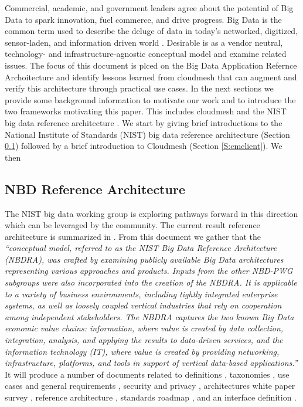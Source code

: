 Commercial, academic, and government leaders agree about the potential
of {\em} Big Data to spark innovation, fuel commerce, and drive
progress. Big Data is the common term used to describe the deluge of
data in today’s networked, digitized, sensor-laden, and information
driven world \cite{nist-bd}. Desirable is as a vendor neutral,
technology- and infrastructure-agnostic conceptual model and examine
related issues.  The focus of this document is plced on the Big Data
Application Refernce Archoitecture and identify lessons learned from
cloudmesh that can augment and verify this architecture through
practical use cases. In the next sections we provide some background
information to motivate our work and to introduce the two frameworks
motivating this paper. This includes cloudmesh \cite{las12-cloud}
\cite{github-cloudmesh-client} and the NIST big data reference
architecture \cite{nist-bd}.  We start by giving brief introductions
to the National Institute of Standards (NIST) big data reference
architecture (Section \ref{S:NBDarch}) followed by a brief
introduction to Cloudmesh (Section \ref{S:cmclient}).  We then

\subsection{NBD Reference Architecture}
\label{S:NBDarch}

The NIST big data working group is exploring pathways
forward in this direction which can be leveraged by the community. The
current result reference architecture is summarized in
\cite{nist-bd}. From this document we gather that the {\it
  ``conceptual model, referred to as the NIST Big Data Reference
  Architecture (NBDRA), was crafted by examining publicly available
  Big Data architectures representing various approaches and
  products. Inputs from the other NBD-PWG subgroups were also
  incorporated into the creation of the NBDRA. It is applicable to a
  variety of business environments, including tightly integrated
  enterprise systems, as well as loosely coupled vertical industries
  that rely on cooperation among independent stakeholders. The NBDRA
  captures the two known Big Data economic value chains: information,
  where value is created by data collection, integration, analysis,
  and applying the results to data-driven services, and the
  information technology (IT), where value is created by providing
  networking, infrastructure, platforms, and tools in support of
  vertical data-based applications.''}  It will produce a number of
documents related to definitions \cite{??}, taxonomies \cite{??}, use
cases and general requirements \cite{??}, security and privacy
\cite{??}, architectures white paper survey \cite{??}, reference
architecture \cite{??}, standards roadmap \cite{??}, and an interface
definition \cite{??}.

